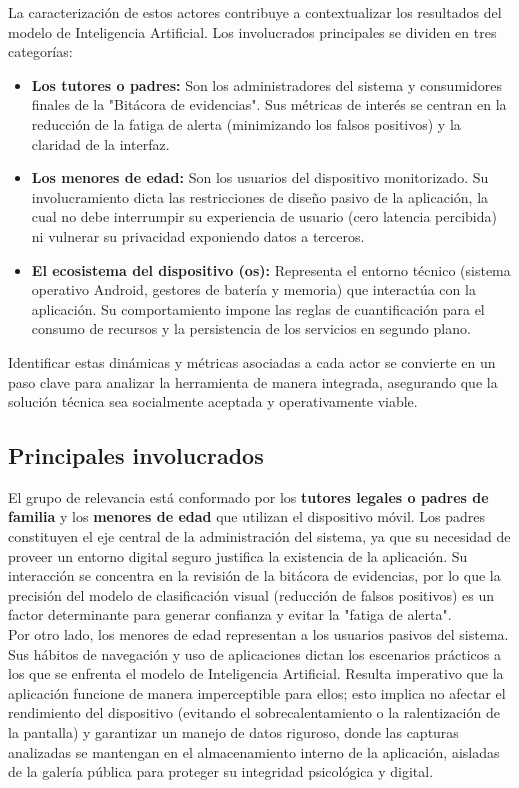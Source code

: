 La caracterización de estos actores contribuye a contextualizar los resultados del modelo de Inteligencia Artificial. Los involucrados principales se dividen en tres categorías:
\begin{itemize}
    \item \textbf{Los tutores o padres:} Son los administradores del sistema y consumidores finales de la "Bitácora de evidencias". Sus métricas de interés se centran en la reducción de la fatiga de alerta (minimizando los falsos positivos) y la claridad de la interfaz.
    \item \textbf{Los menores de edad:} Son los usuarios del dispositivo monitorizado. Su involucramiento dicta las restricciones de diseño pasivo de la aplicación, la cual no debe interrumpir su experiencia de usuario (cero latencia percibida) ni vulnerar su privacidad exponiendo datos a terceros.
    \item \textbf{El ecosistema del dispositivo (\gls{os}):} Representa el entorno técnico (sistema operativo Android, gestores de batería y memoria) que interactúa con la aplicación. Su comportamiento impone las reglas de cuantificación para el consumo de recursos y la persistencia de los servicios en segundo plano.
\end{itemize}

Identificar estas dinámicas y métricas asociadas a cada actor se convierte en un paso clave para analizar la herramienta de manera integrada, asegurando que la solución técnica sea socialmente aceptada y operativamente viable.

\subsection{Principales involucrados}

El grupo de relevancia está conformado por los \textbf{tutores legales o padres de familia} y los \textbf{menores de edad} que utilizan el dispositivo móvil. Los padres constituyen el eje central de la administración del sistema, ya que su necesidad de proveer un entorno digital seguro justifica la existencia de la aplicación. Su interacción se concentra en la revisión de la bitácora de evidencias, por lo que la precisión del modelo de clasificación visual (reducción de falsos positivos) es un factor determinante para generar confianza y evitar la "fatiga de alerta".\\

Por otro lado, los menores de edad representan a los usuarios pasivos del sistema. Sus hábitos de navegación y uso de aplicaciones dictan los escenarios prácticos a los que se enfrenta el modelo de Inteligencia Artificial. Resulta imperativo que la aplicación funcione de manera imperceptible para ellos; esto implica no afectar el rendimiento del dispositivo (evitando el sobrecalentamiento o la ralentización de la pantalla) y garantizar un manejo de datos riguroso, donde las capturas analizadas se mantengan en el almacenamiento interno de la aplicación, aisladas de la galería pública para proteger su integridad psicológica y digital.\\

